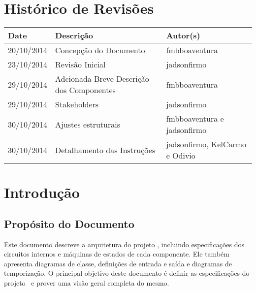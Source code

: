 \documentclass{report}
\begin{document}

\capa
\newpage
\newpage

\chapter*{Histórico de Revisões}
  \vspace*{1cm}
  \begin{table}[ht]
    \centering
    \begin{tabular}[pos]{|m{2cm} | m{8cm} | m{4cm}|} 
      \hline
      \cellcolor[gray]{0.9}
      \textbf{Date} & \cellcolor[gray]{0.9}\textbf{Descrição} & \cellcolor[gray]{0.9}\textbf{Autor(s)}\\
      \hline 20/10/2014 &  Concepção do Documento & fmbboaventura \\ \hline
      		 23/10/2014 &  Revisão Inicial & jadsonfirmo \\ \hline
      		 29/10/2014 &  Adcionada Breve Descrição dos Componentes & fmbboaventura \\ \hline       
      		 29/10/2014 & Stakeholders & jadsonfirmo \\ \hline
      		 30/10/2014 & Ajustes estruturais & fmbboaventura e jadsonfirmo \\ \hline
      		 30/10/2014 & Detalhamento das Instruções & jadsonfirmo, KelCarmo e Odivio \\ \hline
    \end{tabular}
  \end{table}

\tableofcontents

\chapter{Introdução}
  
  \section{Propósito do Documento}
  Este documento descreve a arquitetura do projeto \ipPROCESSProject, incluindo especificações dos circuitos internos e máquinas de estados de cada componente. Ele também apresenta diagramas de classe, definições de entrada e saída e diagramas de temporização. O principal objetivo deste documento é definir as especificações do projeto \ipPROCESSProject\ e prover uma visão geral completa do mesmo.
  
\end{document}
